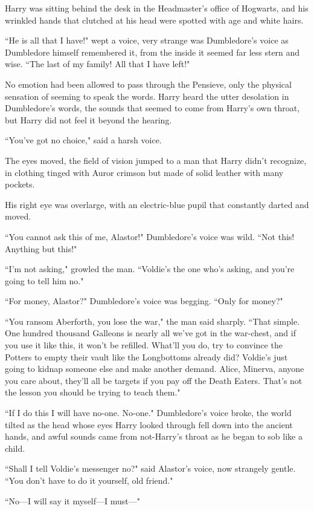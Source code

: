 \begin{em}
Harry was sitting behind the desk in the Headmaster's office of Hogwarts, and his wrinkled hands that clutched at his head were spotted with age and white hairs.

``He is all that I have!" wept a voice, very strange was Dumbledore's voice as Dumbledore himself remembered it, from the inside it seemed far less stern and wise. ``The last of my family! All that I have left!"

No emotion had been allowed to pass through the Pensieve, only the physical sensation of seeming to speak the words. Harry heard the utter desolation in Dumbledore's words, the sounds that seemed to come from Harry's own throat, but Harry did not feel it beyond the hearing.

``You've got no choice," said a harsh voice.

The eyes moved, the field of vision jumped to a man that Harry didn't recognize, in clothing tinged with Auror crimson but made of solid leather with many pockets.

His right eye was overlarge, with an electric-blue pupil that constantly darted and moved.

``You cannot ask this of me, Alastor!" Dumbledore's voice was wild. ``Not this! Anything but this!"

``I'm not asking," growled the man. ``Voldie's the one who's asking, and you're going to tell him no."

``For money, Alastor?" Dumbledore's voice was begging. ``Only for money?"

``You ransom Aberforth, you lose the war," the man said sharply. ``That simple. One hundred thousand Galleons is nearly all we've got in the war-chest, and if you use it like this, it won't be refilled. What'll you do, try to convince the Potters to empty their vault like the Longbottoms already did? Voldie's just going to kidnap someone else and make another demand. Alice, Minerva, anyone you care about, they'll all be targets if you pay off the Death Eaters. That's not the lesson you should be trying to teach them."

``If I do this I will have no-one. No-one." Dumbledore's voice broke, the world tilted as the head whose eyes Harry looked through fell down into the ancient hands, and awful sounds came from not-Harry's throat as he began to sob like a child.

``Shall I tell Voldie's messenger no?" said Alastor's voice, now strangely gentle. ``You don't have to do it yourself, old friend."

``No—I will say it myself—I must—"
\end{em}

